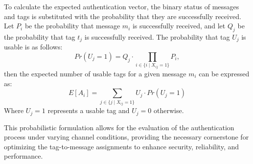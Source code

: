 To calculate the expected authentication vector, the binary status of messages and tags is substituted with the probability that they are successfully received. Let \( P_i \) be the probability that message \( m_i \) is successfully received, and let \( Q_j \) be the probability that tag \( t_j \) is successfully received. The probability that tag \( U_j \) is usable is as follows:
\begin{equation}
    Pr(U_j = 1) = Q_j \cdot \prod_{i \in \{i \mid X_{ij} = 1\}} P_i,
\end{equation}
then the expected number of usable tags for a given message $m_i$ can be expressed as:
\begin{equation}\label{E[A]}
E[A_{i}] = \sum_{j \in \{j \mid X_{ij} = 1\}} U_j \cdot Pr(U_j=1)
\end{equation}
Where \( U_j=1 \) represents a usable tag and \( U_j=0 \) otherwise.

This probabilistic formulation allows for the evaluation of the authentication process under varying channel conditions, providing the necessary cornerstone for optimizing the tag-to-message assignments to enhance security, reliability, and performance.

